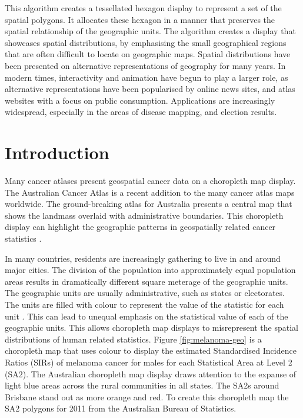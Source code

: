 \documentclass{monashthesis}
\begin{document}
This algorithm creates a tessellated hexagon display to represent a set of the spatial polygons. It allocates these hexagon in a manner that preserves the spatial relationship of the geographic units. The algorithm creates a display that showcases spatial distributions, by emphasising the small geographical regions that are often difficult to locate on geographic maps. Spatial distributions have been presented on alternative representations of geography for many years. In modern times, interactivity and animation have begun to play a larger role, as alternative representations have been popularised by online news sites, and atlas websites with a focus on public consumption. Applications are increasingly widespread, especially in the areas of disease mapping, and election results.

\hypertarget{intro3}{%
\section{Introduction}\label{intro3}}

Many cancer atlases present geospatial cancer data on a choropleth map display.
The Australian Cancer Atlas \autocite{TACA} is a recent addition to the many cancer atlas maps worldwide. The ground-breaking atlas for Australia presents a central map that shows the landmass overlaid with administrative boundaries. This choropleth display can highlight the geographic patterns in geospatially related cancer statistics \autocite{SAMGIS}.

In many countries, residents are increasingly gathering to live in and around major cities.
The division of the population into approximately equal population areas results in dramatically different square meterage of the geographic units. The geographic units are usually administrative, such as states or electorates. The units are filled with colour to represent the value of the statistic for each unit \autocite{EI}.
This can lead to unequal emphasis on the statistical value of each of the geographic units. This allows choropleth map displays to misrepresent the spatial distributions of human related statistics.
Figure \ref{fig:melanoma-geo} is a choropleth map that uses colour to display the estimated Standardised Incidence Ratios (SIRs) of melanoma cancer for males for each Statistical Area at Level 2 (SA2). The Australian choropleth map display draws attention to the expanse of light blue areas across the rural communities in all states. The SA2s around Brisbane stand out as more orange and red. To create this choropleth map the SA2 polygons for 2011 from the Australian Bureau of Statistics.
\end{document}
